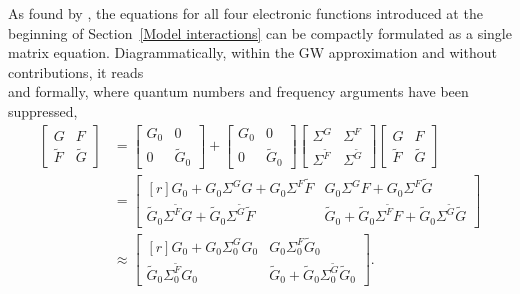 As found by  \cite{Nambu60}, the  equations for all four
electronic  functions introduced at the beginning of
Section~\ref{Model interactions} can be compactly formulated as a single matrix
equation. Diagrammatically, within the GW approximation and without
 contributions, it reads
%
\begin{equation*}
    
\end{equation*}
%
and formally, where quantum numbers and frequency arguments have been
suppressed,
%
\begin{equation} \label{Nambu-Dyson equation}
    \begin{split}
        \begin{bmatrix}
            G & F \\
            \widetilde F & \widetilde G
        \end{bmatrix}
        &=
        \begin{bmatrix}
            G_0 & 0 \\
            0 & \widetilde G_0
        \end{bmatrix}
        +
        \begin{bmatrix}
            G_0 & 0 \\
            0 & \widetilde G_0
        \end{bmatrix}
        \begin{bmatrix}
            \Sigma^G & \Sigma^F \\
            \Sigma^{\widetilde F} & \Sigma^{\widetilde G}
        \end{bmatrix}
        \begin{bmatrix}
            G & F \\
            \widetilde F & \widetilde G
        \end{bmatrix}
        \\
        &=
        \begin{bmatrix*}[r]
            G_0 + G_0 \Sigma^G G + G_0 \Sigma^F \widetilde F
            & G_0 \Sigma^G F + G_0 \Sigma^F \widetilde G \\
            \widetilde G_0 \Sigma^{\widetilde F} G
            + \widetilde G_0 \Sigma^{\widetilde G} \widetilde F
            & \widetilde G_0 + \widetilde G_0 \Sigma^{\widetilde F} F
            + \widetilde G_0 \Sigma^{\widetilde G} \widetilde G
        \end{bmatrix*}
        \\
        &\approx
        \begin{bmatrix*}[r]
            G_0 + G_0 \Sigma^G_0 G_0 & G_0 \Sigma^F_0 \widetilde G_0 \\
            \widetilde G_0 \Sigma^{\widetilde F}_0 G_0 & \widetilde G_0
            + \widetilde G_0 \Sigma^{\widetilde G}_0 \widetilde G_0
        \end{bmatrix*}.
    \end{split}
\end{equation}

